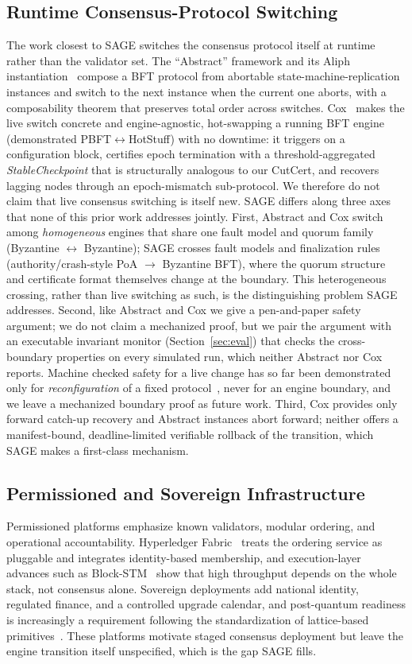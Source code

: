 \documentclass[journal]{IEEEtran}
\begin{document}
\subsection{Runtime Consensus-Protocol Switching}
The work closest to SAGE switches the consensus protocol itself at runtime rather than the
validator set. The ``Abstract'' framework and its Aliph instantiation~\cite{abstract} compose a
BFT protocol from abortable state-machine-replication instances and switch to the next instance
when the current one aborts, with a composability theorem that preserves total order across
switches. Cox~\cite{cox} makes the live switch concrete and engine-agnostic, hot-swapping a
running BFT engine (demonstrated PBFT$\leftrightarrow$HotStuff) with no downtime: it triggers on
a configuration block, certifies epoch termination with a threshold-aggregated
\emph{StableCheckpoint} that is structurally analogous to our CutCert, and recovers lagging nodes
through an epoch-mismatch sub-protocol. We therefore do not claim that live consensus switching
is itself new. SAGE differs along three axes that none of this prior work addresses jointly.
First, Abstract and Cox switch among \emph{homogeneous} engines that share one fault model and
quorum family (Byzantine $\leftrightarrow$ Byzantine); SAGE crosses fault models and finalization
rules (authority/crash-style PoA $\rightarrow$ Byzantine BFT), where the quorum structure and
certificate format themselves change at the boundary. This heterogeneous crossing, rather than
live switching as such, is the distinguishing problem SAGE addresses. Second, like Abstract and
Cox we give a pen-and-paper safety argument; we do not claim a mechanized proof, but we pair the
argument with an executable invariant monitor (Section~\ref{sec:eval}) that checks the
cross-boundary properties on every simulated run, which neither Abstract nor Cox reports. Machine
checked safety for a live change has so far been demonstrated only for \emph{reconfiguration} of a
fixed protocol~\cite{mongoraft,suilutris}, never for an engine boundary, and we leave a mechanized
boundary proof as future work. Third, Cox provides only forward catch-up recovery and Abstract
instances abort forward; neither offers a manifest-bound, deadline-limited verifiable rollback of
the transition, which SAGE makes a first-class mechanism.

\subsection{Permissioned and Sovereign Infrastructure}
Permissioned platforms emphasize known validators, modular ordering, and operational
accountability. Hyperledger Fabric~\cite{fabric} treats the ordering service as pluggable and
integrates identity-based membership, and execution-layer advances such as
Block-STM~\cite{blockstm} show that high throughput depends on the whole stack, not consensus
alone. Sovereign deployments add national identity, regulated finance, and a controlled
upgrade calendar, and post-quantum readiness is increasingly a requirement following the
standardization of lattice-based primitives~\cite{nistpqc}. These platforms motivate staged
consensus deployment but leave the engine transition itself unspecified, which is the gap
SAGE fills.
\end{document}
